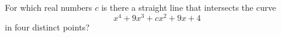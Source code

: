 For which real numbers $c$ is there a straight line that intersects the curve
\[ x^4 + 9x^3 + cx^2 + 9x + 4
\]
in four distinct points?
